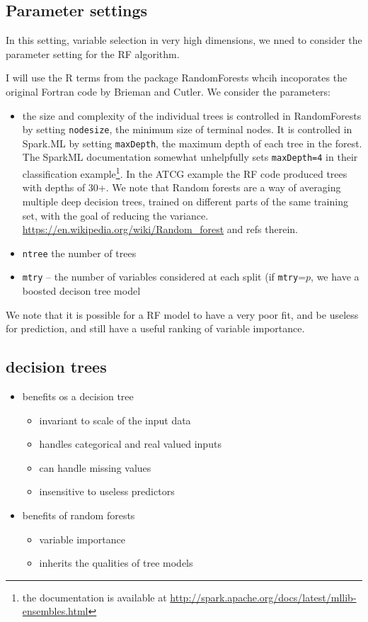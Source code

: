 \documentclass[10pt,letterpaper]{article}
\begin{document}
\subsection*{Parameter settings}
In this setting, variable selection in very high dimensions, we nned to consider the parameter setting for the RF
algorithm. 

I will use the R terms from the package RandomForests whcih incoporates the original Fortran code by Brieman and
Cutler. We consider the parameters:
\begin{itemize}
\item the size and complexity of the individual trees is controlled in RandomForests by setting \texttt{nodesize}, the
  minimum size of terminal nodes. It is controlled in Spark.ML by setting \texttt{maxDepth}, the maximum depth of each
  tree in the forest. The SparkML documentation somewhat unhelpfully sets \texttt{maxDepth=4} in their classification
  example\footnote{the documentation is available at \url{http://spark.apache.org/docs/latest/mllib-ensembles.html} }.
  In the ATCG example the RF code produced trees with depths of 30+. We note that Random forests are a way of averaging
  multiple deep decision trees, trained on different parts of the same training set, with the goal of reducing the
  variance. \url{https://en.wikipedia.org/wiki/Random_forest} and refs therein.  
\item \texttt{ntree} the number of trees 
\item \texttt{mtry} --  the number of variables considered at each split (if \texttt{mtry}=$p$, we have a boosted decison
  tree model 
\end{itemize}

We note that it is possible for a RF model to have a very poor fit, and be useless for prediction, and still have a 
useful ranking of variable importance.

\subsection*{decision trees }
\begin{itemize}
\item benefits os a decision tree
  \begin{itemize}
  \item invariant to scale of the input data
  \item handles categorical and real valued inputs 
  \item can handle missing values 
  \item insensitive to useless predictors
  \end{itemize}
\item benefits of random forests
  \begin{itemize}
  \item variable importance 
  \item inherits the qualities of tree models
  \end{itemize}
\end{itemize}
\end{document}
